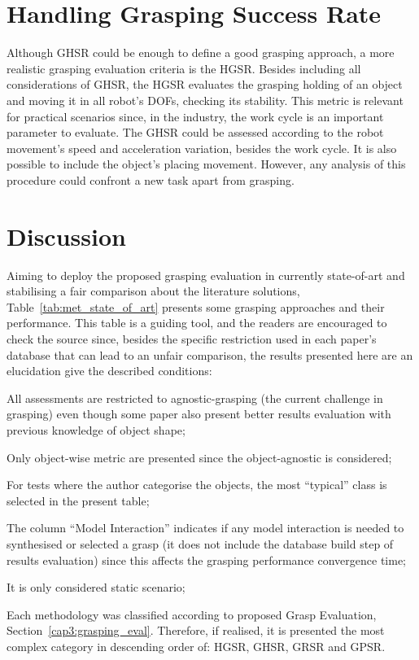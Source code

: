 \section{Handling Grasping Success Rate}
\label{cap3:grasping_eval:sec:hgsr}

Although \ac{GHSR} could be enough to define a good grasping approach, a more realistic grasping evaluation criteria is the \ac{HGSR}.  Besides including all considerations of \ac{GHSR},  the \ac{HGSR} evaluates the grasping holding of an object and moving it in all robot's DOFs, checking its stability. This metric is relevant for practical scenarios since, in the industry, the work cycle is an important parameter to evaluate. The \ac{GHSR} could be assessed according to the robot movement's speed and acceleration variation, besides the work cycle. It is also possible to include the object's placing movement. However, any analysis of this procedure could confront a new task apart from grasping.

\section{Discussion}
\label{cap3:grasping_eval:sec:discussion}

Aiming to deploy the proposed grasping evaluation in currently state-of-art and stabilising a fair comparison about the literature solutions, Table~\ref{tab:met_state_of_art} presents some grasping approaches and their performance. This table is a guiding tool, and the readers are encouraged to check the source since, besides the specific restriction used in each paper's database that can lead to an unfair comparison, the results presented here are an elucidation give the described conditions: 

\begin{enumerate_jp}
    \item All assessments are restricted to agnostic-grasping (the current challenge in grasping) even though some paper also present better results evaluation with previous knowledge of object shape; 
    \item Only object-wise metric are presented since the object-agnostic is considered;
    \item For tests where the author categorise the objects, the most ``typical'' class is selected in the present table;
    \item The column ``Model Interaction'' indicates if any model interaction is needed to synthesised or selected a grasp (it does not include the database build step of results evaluation) since this affects the grasping performance convergence time;
    \item It is only considered static scenario;
    \item Each methodology was classified according to proposed Grasp Evaluation, Section~\ref{cap3:grasping_eval}. Therefore, if realised, it is presented the most complex category in descending order of: \ac{HGSR}, \ac{GHSR}, \ac{GRSR} and \ac{GPSR}. 
\end{enumerate_jp}



